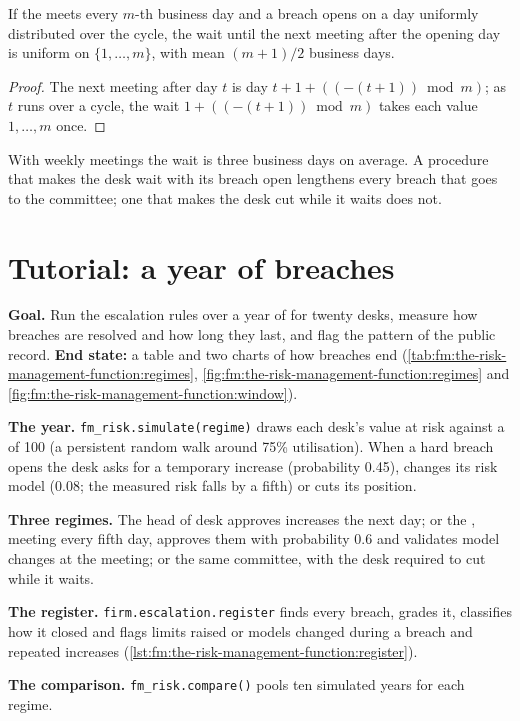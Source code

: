\begin{proposition}\label{prop:fm:the-risk-management-function:wait}
If the  meets every $m$-th business day and a breach opens on a day uniformly distributed over the cycle, the wait until the next
meeting after the opening day is uniform on $\{1,\dots,m\}$, with mean $(m+1)/2$ business days.
\end{proposition}

\begin{proof}
The next meeting after day $t$ is day $t+1+((-(t+1))\bmod m)$; as $t$ runs over a cycle, the wait $1+((-(t+1))\bmod m)$ takes each value
$1,\dots,m$ once.
\end{proof}

With weekly meetings the wait is three business days on average. A procedure that makes the desk wait with its breach open lengthens every breach
that goes to the committee; one that makes the desk cut while it waits does not.

\section{Tutorial: a year of breaches}\label{tut:fm:the-risk-management-function:tut}

\begin{tutorial}
\textbf{Goal.} Run the escalation rules over a year of  for twenty desks, measure how breaches are resolved and how long they last,
and flag the pattern of the public record. \textbf{End state:} a table and two charts of how breaches end (\cref{tab:fm:the-risk-management-function:regimes},
\cref{fig:fm:the-risk-management-function:regimes} and \cref{fig:fm:the-risk-management-function:window}).
\begin{tutsteps}
\item \textbf{The year.} \texttt{fm\_risk.simulate(regime)} draws each desk's value at risk against a  of 100 (a persistent random walk
around 75\% utilisation). When a hard breach opens the desk asks for a temporary increase (probability 0.45), changes its risk model (0.08; the
measured risk falls by a fifth) or cuts its position.
\item \textbf{Three regimes.} The head of desk approves increases the next day; or the , meeting every fifth day, approves them with
probability 0.6 and validates model changes at the meeting; or the same committee, with the desk required to cut while it waits.
\item \textbf{The register.} \texttt{firm.escalation.register} finds every breach, grades it, classifies how it closed and flags limits raised or
models changed during a breach and repeated increases (\cref{lst:fm:the-risk-management-function:register}).
\item \textbf{The comparison.} \texttt{fm\_risk.compare()} pools ten simulated years for each regime.
\end{tutsteps}
\end{tutorial}

